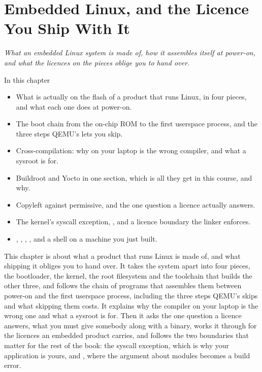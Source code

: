 
\chapter{Embedded Linux, and the Licence You Ship With It}
\label{c1:ch}

{\large\itshape What an embedded Linux system is made of, how it assembles itself at power-on, and
what the licences on the pieces oblige you to hand over.\par}

\begin{chapterbox}{In this chapter}
\begin{itemize}
  \item What is actually on the flash of a product that runs Linux, in four pieces, and what each
    one does at power-on.
  \item The boot chain from the on-chip ROM to the first userspace process, and the three steps
    QEMU's  lets you skip.
  \item Cross-compilation: why  on your laptop is the wrong compiler, and what a sysroot
    is for.
  \item Buildroot and Yocto in one section, which is all they get in this course, and why.
  \item Copyleft against permissive, and the one question a licence actually answers.
  \item The kernel's syscall exception, , and a licence boundary the linker
    enforces.
  \item {}, , , , and a shell on a
    machine you just built.
\end{itemize}
\end{chapterbox}

This chapter is about what a product that runs Linux is made of, and what shipping it obliges you
to hand over. It takes the system apart into four pieces, the bootloader, the kernel, the root
filesystem and the toolchain that builds the other three, and follows the chain of programs that
assembles them between power-on and the first userspace process, including the three steps QEMU's
 skips and what skipping them costs. It explains why the compiler on your laptop is
the wrong one and what a sysroot is for. Then it asks the one question a licence answers, what you
must give somebody along with a binary, works it through for the licences an embedded product
carries, and follows the two boundaries that matter for the rest of the book: the syscall exception,
which is why your application is yours, and , where the argument about
modules becomes a build error.

